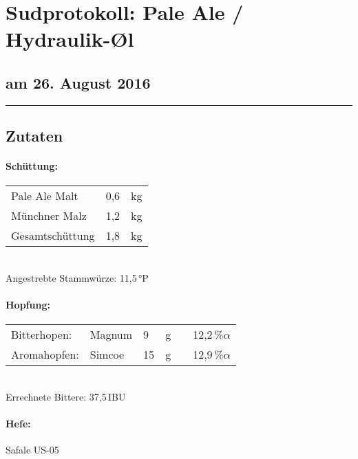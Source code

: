 \documentclass[12pt,oneside,a4paper]{scrartcl}
\begin{document}
	\begin{minipage}[c]{0.70\textwidth}
		\section*{\hspace{-.4cm}Sudprotokoll: Pale Ale / Hydraulik-\O{}l}
	\end{minipage}
	\begin{minipage}[c]{0.29\textwidth}
		\subsection*{am 26. August 2016}
	\end{minipage}
	\rule{\textwidth}{1pt}\vspace{5mm}
%
\subsection*{Zutaten}
%
\paragraph{Schüttung:}
	\begin{tabular}[t]{m{8cm} m{2cm} m{1cm}}
		Pale Ale Malt & 0,6 & kg \bigstrut\\
		Münchner Malz & 1,2 & kg \bigstrut\\\hline
		Gesamtschüttung & 1,8 & kg\bigstrut
	\end{tabular}\\

\vspace{.25cm}
\hspace{1cm}Angestrebte Stammwürze: 11,5\,°P
%
\paragraph{Hopfung:}
	\begin{tabular}[t]{m{2.5cm} m{5cm} m{0.5cm} m{1cm} m{0.5cm} m{1cm}}
		Bitterhopen: & Magnum & 9 & g &  & 12,2\,\%$\alpha$ \\%
		Aromahopfen: & Simcoe & 15 & g &  & 12,9\,\%$\alpha$%
	\end{tabular}\\

\vspace{.25cm}
\hspace{1cm}Errechnete Bittere: 37,5\,IBU
%
\paragraph{Hefe:}
	Safale US-05
\end{document}
